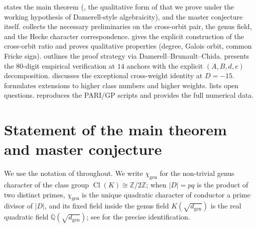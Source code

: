 \documentclass[11pt]{amsart}
\theoremstyle{definition}
\theoremstyle{remark}
\DeclareMathOperator{\Cl}{Cl}
\newcommand{\Q}{\mathbb{Q}}
\newcommand{\Z}{\mathbb{Z}}
\begin{document}
 states the main theorem (, the
qualitative form of  that we prove under the
working hypothesis of Damerell-style algebraicity), and the master
conjecture itself.  collects the necessary
preliminaries on the cross-orbit pair, the genus field, and the
Hecke character correspondence.  gives the
explicit construction of the cross-orbit ratio and proves
qualitative properties (degree, Galois orbit, common Fricke sign).
 outlines the proof strategy via
Damerell--Brunault--Chida.  presents the
80-digit empirical verification at \(14\) anchors with the explicit
\((A, B, d, e)\) decomposition.  discusses
the exceptional cross-weight identity at \(D = -15\).
 formulates extensions to higher class numbers
and higher weights.  lists open questions.
 reproduces the PARI/GP scripts and 
provides the full numerical data.


\section{Statement of the main theorem and master conjecture}\label{sec:statement}

We use the notation of  throughout. We write
\(\chi_{\mathrm{gen}}\) for the non-trivial genus character of the
class group \(\Cl(K) \cong \Z/2\Z\); when \(|D| = pq\) is the product
of two distinct primes, \(\chi_{\mathrm{gen}}\) is the unique
quadratic character of conductor a prime divisor of \(|D|\), and
its fixed field inside the genus field
\(K(\sqrt{d_{\mathrm{gen}}})\) is the real quadratic field
\(\Q(\sqrt{d_{\mathrm{gen}}})\); see  for the
precise identification.
\end{document}
